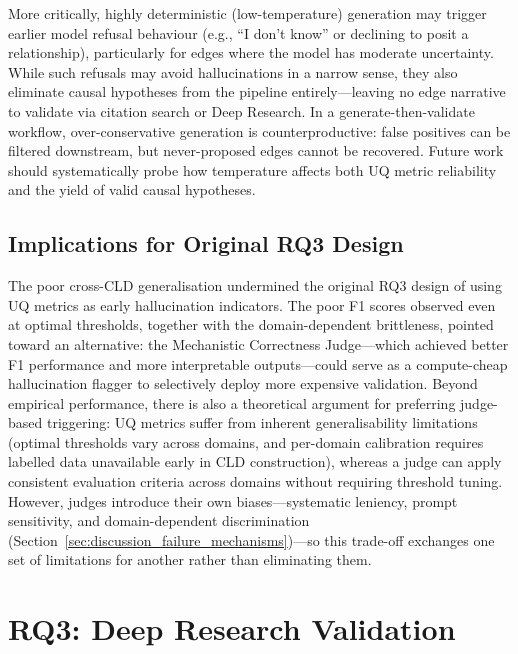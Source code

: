 More critically, highly deterministic (low-temperature) generation may trigger earlier model refusal behaviour (e.g., ``I don't know'' or declining to posit a relationship), particularly for edges where the model has moderate uncertainty. While such refusals may avoid hallucinations in a narrow sense, they also eliminate causal hypotheses from the pipeline entirely---leaving no edge narrative to validate via citation search or Deep Research. In a generate-then-validate workflow, over-conservative generation is counterproductive: false positives can be filtered downstream, but never-proposed edges cannot be recovered. Future work should systematically probe how temperature affects both UQ metric reliability and the yield of valid causal hypotheses.

\subsection{Implications for Original RQ3 Design}

The poor cross-CLD generalisation undermined the original RQ3 design of using UQ metrics as early hallucination indicators. The poor F1 scores observed even at optimal thresholds, together with the domain-dependent brittleness, pointed toward an alternative: the Mechanistic Correctness Judge---which achieved better F1 performance and more interpretable outputs---could serve as a compute-cheap hallucination flagger to selectively deploy more expensive validation. Beyond empirical performance, there is also a theoretical argument for preferring judge-based triggering: UQ metrics suffer from inherent generalisability limitations (optimal thresholds vary across domains, and per-domain calibration requires labelled data unavailable early in CLD construction), whereas a judge can apply consistent evaluation criteria across domains without requiring threshold tuning. However, judges introduce their own biases---systematic leniency, prompt sensitivity, and domain-dependent discrimination (Section~\ref{sec:discussion_failure_mechanisms})---so this trade-off exchanges one set of limitations for another rather than eliminating them.

\section{RQ3: Deep Research Validation}
\label{sec:discussion_rq3}
\label{sec:rq3_pivot}

